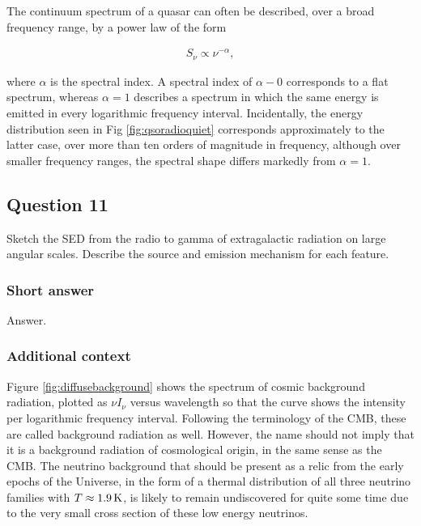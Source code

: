 \documentclass[a4paper,11pt]{article}
\begin{document}
{\noindent}The continuum spectrum of a quasar can often be described, over a broad frequency range, by a power law of the form

\begin{align*}
    S_\nu \propto \nu^{-\alpha},
\end{align*}

{\noindent}where $\alpha$ is the spectral index. A spectral index of $\alpha-0$ corresponds to a flat spectrum, whereas $\alpha=1$ describes a spectrum in which the same energy is emitted in every logarithmic frequency interval. Incidentally, the energy distribution seen in Fig \ref{fig:qsoradioquiet} corresponds approximately to the latter case, over more than ten orders of magnitude in frequency, although over smaller frequency ranges, the spectral shape differs markedly from $\alpha=1$.



\newpage
\subsection{Question 11}

Sketch the SED from the radio to gamma of extragalactic radiation on large angular scales. Describe the source and emission mechanism for each feature.

\subsubsection{Short answer}

Answer.

\subsubsection{Additional context}

Figure \ref{fig:diffusebackground} shows the spectrum of cosmic background radiation, plotted as $\nu I_\nu$ versus wavelength so that the curve shows the intensity per logarithmic frequency interval. Following the terminology of the CMB, these are called background radiation as well. However, the name should not imply that it is a background radiation of cosmological origin, in the same sense as the CMB. The neutrino background that should be present as a relic from the early epochs of the Universe, in the form of a thermal distribution of all three neutrino families with $T\approx1.9\,{\rm K}$, is likely to remain undiscovered for quite some time due to the very small cross section of these low energy neutrinos.
\end{document}
